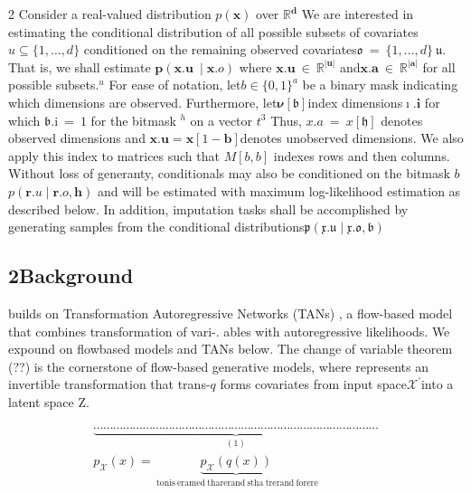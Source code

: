 \documentclass{article}
\begin{document}
\begin{paracol}{2}
Consider a real-valued distribution $p ( { \pmb x } )$ over $\mathbb { R } ^ { \mathbf { d } }$ We are
interested in estimating the conditional distribution of all
possible subsets of covariates $u \subseteq \{ 1, \dots, d \}$ conditioned
on the remaining observed covariates${ \mathfrak { o } } ~ = ~ \{ 1, \dots, d \} ~ { \mathfrak { u } }.$
That is, we shall estimate $\pmb { p } ( \pmb { x } . { \pmb { u } } ~ \mid \pmb { x } . { o } )$ where $\pmb { x } . { \pmb { u } } ~ \in ~ \mathbb { R } ^ { | \pmb { u } | }$
and$\pmb { x } . { \pmb { a } } ~ \in ~ \mathbb { R } ^ { | \pmb { a } | }$ for all possible subsets.$^ { u }$ For ease of notation, let$b \in \{ 0, 1 \} ^ { a }$ be a binary mask indicating which dimensions are observed. Furthermore, let${ \pmb \nu } [ { \mathfrak { b } } ]$index dimensions$\imath . { \mathbf { i } }$ for which $\mathfrak { b } . { \mathrm { i } } ~ = ~ 1$ for the bitmask $^ { h }$ on a vector $t ^ { 3 }$ Thus, $x . { a } ~ = ~ x \left [ { \mathfrak { h } } \right ]$ denotes observed dimensions and
$\pmb { x } . { \pmb { u } } = \pmb { x } \left [ 1 - \pmb { b } \right ]$denotes unobserved dimensions. We also apply this index to matrices such that $M [ b, b ]$ indexes rows
and then columns. Without loss of generanty, conditionals
may also be conditioned on the bitmask $b$ $p ( \mathbf { r } . { u } \mid \mathbf { r } . { o }, \mathbf { h } )$
and will be estimated with maximum log-likelihood estimation as described below. In addition, imputation tasks shall
be accomplished by generating samples from the conditional
distributions${ \mathfrak { p } } ( { \mathfrak { x } } . { \mathfrak { u } } \mid { \mathfrak { x } } . { \mathfrak { o } }, { \mathfrak { b } } )$


\subsection*{2Background}


builds on Transformation Autoregressive Networks (TANs)
, a flow-based model that combines transformation of vari-.
ables with autoregressive likelihoods. We expound on flowbased models and TANs below. The change of variable theorem (??) is the cornerstone of flow-based generative models,
where represents an invertible transformation that trans-$q$
forms covariates from input space$\boldsymbol { \mathcal { X } } ^ { \prime }$into a latent space Z.


\begin{equation}
\begin{array} { r } { \underbrace { \cdots \cdots \cdots \cdots \cdots \cdots \cdots \cdots \cdots \cdots \cdots \cdots \cdots \cdots \cdots \cdots \cdots \cdots \cdots \cdots \cdots \cdots \cdots \cdots \cdots \cdots \cdots \cdots \cdots } _ { ( 1 ) } } \\ { p _ { \mathcal { X } } ( x ) = \left. \underbrace { p _ { \mathcal { X } } ( q ( x ) ) } _ { \mathrm { ~ t o n i s ~ e r a m e d ~ t h a r e r a n d ~ s t h a ~ t r e r a n d ~ f o r e r e } } \right. } \end{array}
\end{equation}



\end{paracol}
\end{document}
